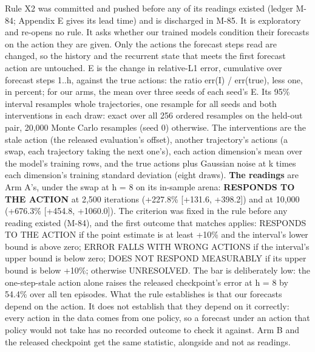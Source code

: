 \documentclass[10pt]{article}
\begin{document}
Rule X2 was committed and pushed before any of its readings existed (ledger M-84; Appendix E gives its lead time) and is discharged in M-85. It is exploratory and re-opens no rule. It asks whether our trained models condition their forecasts on the action they are given. Only the actions the forecast steps read are changed, so the history and the recurrent state that meets the first forecast action are untouched. E is the change in relative-L1 error, cumulative over forecast steps 1..h, against the true actions: the ratio err(I) / err(true), less one, in percent; for our arms, the mean over three seeds of each seed's E. Its 95\% interval resamples whole trajectories, one resample for all seeds and both interventions in each draw: exact over all 256 ordered resamples on the held-out pair, 20,000 Monte Carlo resamples (seed 0) otherwise. The interventions are the stale action (the released evaluation's offset), another trajectory's actions (a swap, each trajectory taking the next one's), each action dimension's mean over the model's training rows, and the true actions plus Gaussian noise at k times each dimension's training standard deviation (eight draws). \textbf{The readings} are Arm A's, under the swap at h = 8 on its in-sample arena: \textbf{RESPONDS TO THE ACTION} at 2,500 iterations (+227.8\% [+131.6, +398.2]) and at 10,000 (+676.3\% [+454.8, +1060.0]). The criterion was fixed in the rule before any reading existed (M-84), and the first outcome that matches applies: RESPONDS TO THE ACTION if the point estimate is at least +10\% and the interval's lower bound is above zero; ERROR FALLS WITH WRONG ACTIONS if the interval's upper bound is below zero; DOES NOT RESPOND MEASURABLY if its upper bound is below +10\%; otherwise UNRESOLVED. The bar is deliberately low: the one-step-stale action alone raises the released checkpoint's error at h = 8 by 54.4\% over all ten episodes. What the rule establishes is that our forecasts depend on the action. It does not establish that they depend on it correctly: every action in the data comes from one policy, so a forecast under an action that policy would not take has no recorded outcome to check it against. Arm B and the released checkpoint get the same statistic, alongside and not as readings.
\end{document}
